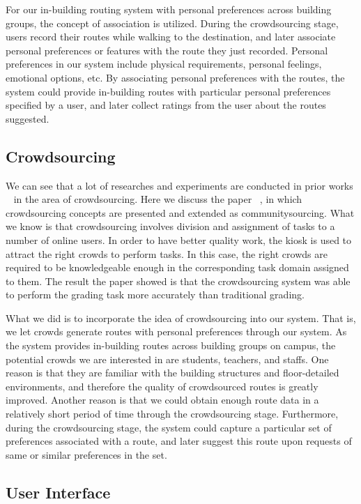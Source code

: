 \documentclass{sigchi}
\begin{document}
For our in-building routing system with personal preferences across building groups, the concept of association is utilized. During the crowdsourcing stage, users record their routes while walking to the destination, and later associate personal preferences or features with the route they just recorded. Personal preferences in our system include physical requirements, personal feelings, emotional options, etc. By associating personal preferences with the routes, the system could provide in-building routes with particular personal preferences specified by a user, and later collect ratings from the user about the routes suggested. 

\subsection{Crowdsourcing}

We can see that a lot of researches and experiments are conducted in prior works ~\cite{heimerl2012communitysourcing,alt2010location} in the area of crowdsourcing. Here we discuss the paper ~\cite{heimerl2012communitysourcing}, in which crowdsourcing concepts are presented and extended as communitysourcing. What we know is that crowdsourcing involves division and assignment of tasks to a number of online users. In order to have better quality work, the kiosk is used to attract the right crowds to perform tasks. In this case, the right crowds are required to be knowledgeable enough in the corresponding task domain assigned to them. The result the paper showed is that the crowdsourcing system was able to perform the grading task more accurately than traditional grading.


What we did is to incorporate the idea of crowdsourcing into our system. That is, we let crowds generate routes with personal preferences through our system. As the system provides in-building routes across building groups on campus, the potential crowds we are interested in are students, teachers, and staffs. One reason is that they are familiar with the building structures and floor-detailed environments, and therefore the quality of crowdsourced routes is greatly improved. Another reason is that we could obtain enough route data in a relatively short period of time through the crowdsourcing stage. Furthermore, during the crowdsourcing stage, the system could capture a particular set of preferences associated with a route, and later suggest this route upon requests of same or similar preferences in the set.


\subsection{User Interface}
\end{document}
